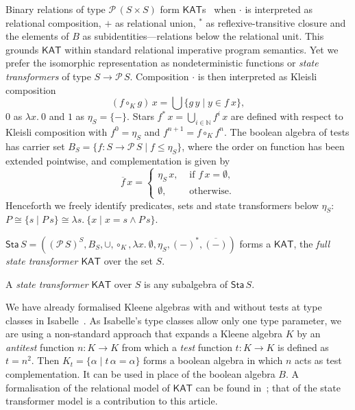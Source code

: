 \documentclass[envcountsame]{llncs}
\newcommand{\KAT}{\mathsf{KAT}}
\newcommand{\Pow}{\mathcal{P}}
\newcommand{\sta}{\mathsf{Sta}}
\begin{document}
Binary relations of type $\Pow\, (S\times S)$ form
$\KAT$s~\cite{Kozen97} when $\cdot$ is interpreted as relational
composition, $+$ as relational union, $^\ast$ as reflexive-transitive
closure and the elements of $B$ as subidentities---relations below the
relational unit. This grounds $\KAT$ within standard relational
imperative program semantics. Yet we prefer the isomorphic
representation as nondeterministic functions or \emph{state
  transformers} of type $S\to \Pow\, S$.  Composition $\cdot$ is then
interpreted as Kleisli composition
\begin{equation*} 
(f\circ_K g)\, x = \bigcup\{g\, y\mid y \in f\ x \}, 
\end{equation*} 
$0$ as $\lambda x.\ 0$ and $1$ as $\eta_S = \{-\}$.  Stars
$f^{\ast}\, x = \bigcup_{i\in\mathbb{N}} f^i\, x$ are defined with
  respect to Kleisli composition with $f^{0} = \eta_S$ and
  $f^{n+1} = f \circ_K f^{n}$. The boolean algebra of tests has
  carrier set $B_S=\{f:S\to \Pow\, S \mid f\le \eta_S\}$, where the
  order on function has been extended pointwise,  and complementation
  is given by
  \begin{equation*} 
    \overline{f}\, x =
  \begin{cases}
    \eta_S\, x, & \text{ if } f\, x = \emptyset,\\
\emptyset, & \text{ otherwise}.
  \end{cases}
\end{equation*}
Henceforth we freely identify predicates, sets and state 
transformers below $\eta_S$: 
$P\cong \{s\mid P\, s\}\cong \lambda s.\ \{x\mid x=s \land P\, s\}$.

\begin{proposition}\label{P:kleisli-ka}
$\sta\, S = ((\Pow\, S)^S,B_S,\cup,\circ_K,\lambda x.\
  \emptyset, \eta_S,(-)^{\ast},\overline{(-)})$
  forms a $\KAT$, the \emph{full state transformer $\KAT$} over the
  set $S$.
\end{proposition}
A \emph{state transformer $\KAT$} over $S$ is any subalgebra of
$\sta\, S$. 

We have already formalised Kleene algebras with and without tests at
type classes in Isabelle~\cite{afp:ka,afp:kat}.  As Isabelle's type
classes allow only one type parameter, we are using a non-standard
approach that expands a Kleene algebra $K$ by an \emph{antitest}
function $n:K\to K$ from which a \emph{test} function $t:K\to K$ is
defined as $t=n^2$. Then $K_t = \{\alpha \mid t\, \alpha = \alpha\}$
forms a boolean algebra in which $n$ acts as test complementation. It
can be used in place of the boolean algebra $B$.  A formalisation of
the relational model of $\KAT$ can be found in~\cite{afp:kat}; that of
the state transformer model is a contribution to this article.
\end{document}
